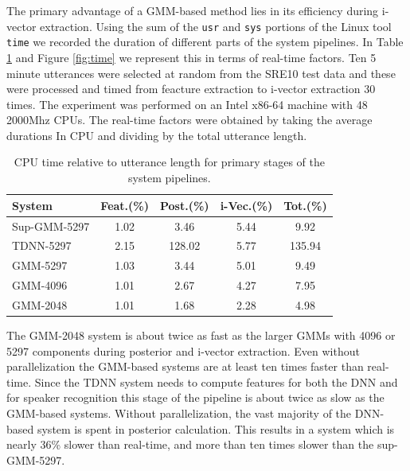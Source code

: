 \documentclass{article}
\begin{document}
The primary advantage of a GMM-based method lies in its
efficiency during i-vector extraction. Using the sum of the \texttt{usr}
and \texttt{sys}
portions of the Linux tool \texttt{time} we recorded the duration of
different parts of the system pipelines. In Table \ref{timing} and
Figure \ref{fig:time} we represent this in terms of real-time factors.
Ten 5 minute utterances
were selected at random from the SRE10 test data and these were processed
and timed from feacture extraction to i-vector extraction 30 times. The
experiment was performed on an Intel x86-64 machine with 48 2000Mhz CPUs.
The real-time factors were obtained by taking the average durations In CPU and
dividing by the total utterance length. 

\begin{table}
\caption{CPU time relative to utterance length for primary stages of the system pipelines.}
\begin{center}
\begin{tabular}{l|cccc}
\hline
System & Feat.(\%) & Post.(\%) & i-Vec.(\%) & Tot.(\%) \\ \hline \hline
Sup-GMM-5297 & 1.02 & 3.46 & 5.44 & 9.92 \\
TDNN-5297 & 2.15 & 128.02 & 5.77 & 135.94 \\
GMM-5297 & 1.03 & 3.44 & 5.01 & 9.49 \\
GMM-4096 & 1.01 & 2.67 & 4.27 & 7.95 \\
GMM-2048 & 1.01 & 1.68 & 2.28 & 4.98 \\ \hline
\end{tabular}
\end{center}
\label{timing}
\end{table}


The GMM-2048 system is about twice as fast as the
larger GMMs with 4096 or 5297 components during posterior and i-vector
extraction. Even without
parallelization the GMM-based systems are at least ten times faster than
real-time. Since the TDNN system needs to compute features for both the
DNN and for speaker recognition this stage of the pipeline is about twice
as slow as the GMM-based systems.
Without parallelization, the vast majority of the DNN-based system is spent 
in posterior calculation. This results in a system which is nearly 36\% slower 
than real-time, and more than ten times slower than the sup-GMM-5297.
\end{document}
